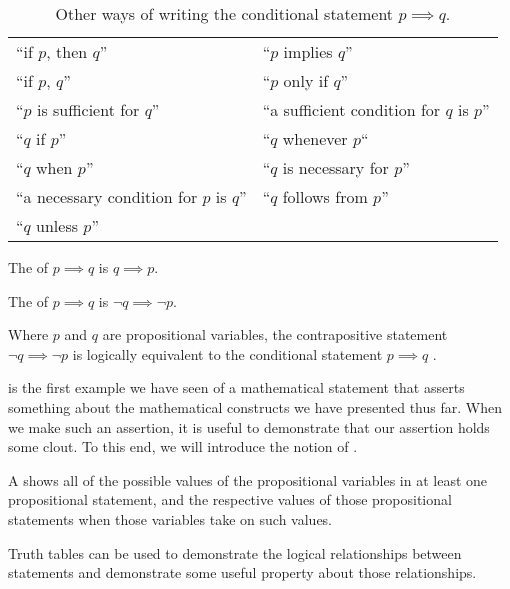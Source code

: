 \begin{table}[H]
  \centering
    \begin{tabular}{p{2in} p{2in}}
      ``if \(p\), then \(q\)''                     & ``\(p\) implies \(q\)'' \\
      ``if \(p\), \(q\)''                          & ``\(p\) only if \(q\)'' \\
      ``\(p\) is sufficient for \(q\)''            & ``a sufficient condition for \(q\) is \(p\)'' \\
      ``\(q\) if \(p\)''                           & ``\(q\) whenever \(p\)`` \\
      ``\(q\) when \(p\)''                         & ``\(q\) is necessary for \(p\)'' \\
      ``a necessary condition for \(p\) is \(q\)'' & ``\(q\) follows from \(p\)'' \\
      ``\(q\) unless \(p\)''
    \end{tabular}
  \caption{Other ways of writing the conditional statement \(p \implies q\).}
  \label{tab:conditionals}
\end{table}

\begin{defn}[converse]
  The  of \(p \implies q\) is \(q \implies p\).
\end{defn}

\begin{defn}
  The  of
  $p \implies q$ is $\neg q \implies \neg p$.
  \label{def:contrapositive}
\end{defn}

\begin{theorem}
  Where $p$ and $q$ are propositional variables,
  the contrapositive statement
  $\neg q \implies \neg p$
  is logically equivalent to the conditional statement
  $p \implies q$
  .
  \label{thm:contrapositive-conditional}
\end{theorem}

 is the first example we have seen
of a mathematical statement that asserts something about the mathematical
constructs we have presented thus far.
When we make such an assertion, it is useful to demonstrate that our assertion
holds some clout.
To this end, we will introduce the notion of .

\begin{defn}
  A  shows all of the possible values
  of the propositional variables in at least one propositional statement,
  and the respective values of those propositional statements when those
  variables take on such values.

  Truth tables can be used to demonstrate the logical relationships between
  statements and demonstrate some useful property about those relationships.
\end{defn}


